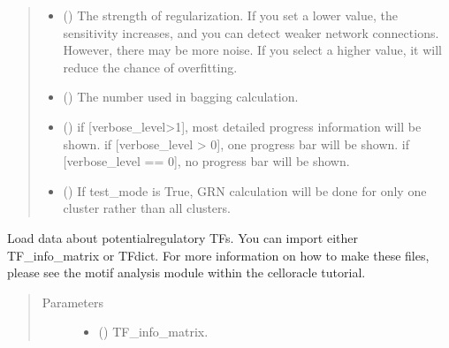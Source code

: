 \documentclass[letterpaper,10pt,english]{sphinxmanual}
\begin{document}
\begin{fulllineitems}
\begin{fulllineitems}
\begin{quote}
\begin{description}
\begin{itemize}
\item {} 
 () \textendash{} The strength of regularization.
If you set a lower value, the sensitivity increases, and you can detect weaker network connections. However, there may be more noise.
If you select a higher value, it will reduce the chance of overfitting.

\item {} 
 () \textendash{} The number used in bagging calculation.

\item {} 
 () \textendash{} if {[}verbose\_level\textgreater{}1{]}, most detailed progress information will be shown.
if {[}verbose\_level \textgreater{} 0{]}, one progress bar will be shown.
if {[}verbose\_level == 0{]}, no progress bar will be shown.

\item {} 
 () \textendash{} If test\_mode is True, GRN calculation will be done for only one cluster rather than all clusters.

\end{itemize}

\end{description}\end{quote}

\end{fulllineitems}


\begin{fulllineitems}
\label{\detokenize{modules/celloracle:celloracle.Oracle.import_TF_data}}
Load data about potential\sphinxhyphen{}regulatory TFs.
You can import either TF\_info\_matrix or TFdict.
For more information on how to make these files, please see the motif analysis module within the celloracle tutorial.
\begin{quote}\begin{description}
\item[{Parameters}] \leavevmode\begin{itemize}
\item {} 
 () \textendash{} TF\_info\_matrix.


\end{itemize}
\end{description}
\end{quote}
\end{fulllineitems}
\end{fulllineitems}
\end{document}

